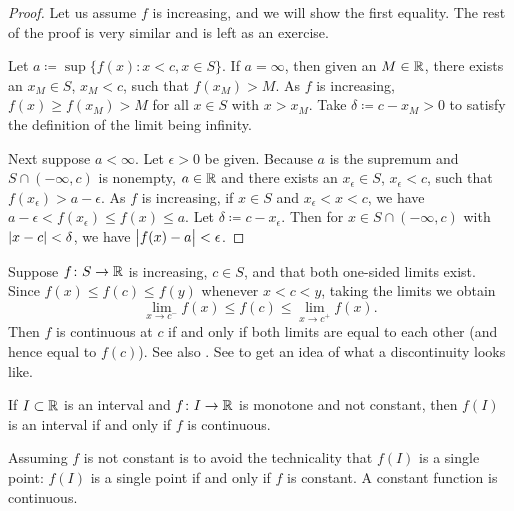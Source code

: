 \begin{proof}
Let us assume $f$ is increasing, and we will show the first
equality.  The rest of the proof is very similar and is left as an
exercise.

Let $a \coloneqq \sup \{ f(x) : x < c, x \in S \}$.  If $a = \infty$,
then given an $M \in {\mathbb{R}}$, there exists an $x_M \in S$, $x_M < c$, such that $f(x_M) > M$. 
As $f$ is increasing, $f(x) \geq f(x_M) >  M$ for all $x \in S$ with $x > x_M$.
Take $\delta \coloneqq c-x_M > 0$ to satisfy the definition of the limit
being infinity.

Next suppose $a < \infty$.
Let $\epsilon > 0$ be given.  Because $a$ is the supremum and
$S \cap (-\infty,c)$ is nonempty, $a \in {\mathbb{R}}$ and
there exists an
$x_\epsilon \in S$,
$x_\epsilon < c$,
such that $f(x_\epsilon) > a-\epsilon$.  As $f$ is increasing,
if $x \in S$ and $x_\epsilon < x < c$, we have
$a-\epsilon < f(x_\epsilon) \leq f(x) \leq a$.  Let
$\delta \coloneqq c-x_\epsilon$.  Then for $x \in S \cap (-\infty,c)$
with $\lvert {x-c} \rvert < \delta$,
we have $\bigl\lvert {f(x)-a} \bigr\rvert < \epsilon$.
\end{proof}

Suppose $f \colon S \to {\mathbb{R}}$ is increasing, $c \in S$, and
that both one-sided limits exist.
Since $f(x) \leq f(c) \leq f(y)$
whenever $x < c < y$, taking the limits we obtain
\begin{equation*}
\lim_{x \to c^-} f(x) \leq f(c) \leq \lim_{x \to c^+} f(x) .
\end{equation*}
Then $f$ is continuous at $c$ if and only if both limits are equal
to each other (and hence equal to $f(c)$).  See also
.
See  to get an idea of what a discontinuity
looks like.


\begin{cor} \label{cor:continterval}
If $I \subset {\mathbb{R}}$ is an interval and $f \colon I \to {\mathbb{R}}$ is 
monotone and not constant, then $f(I)$ is an interval if and only if $f$
is continuous.
\end{cor}

Assuming $f$ is not constant is to avoid the technicality
that $f(I)$ is a single point: $f(I)$ is a single
point if and only if $f$ is constant.  A constant function is 
continuous.

